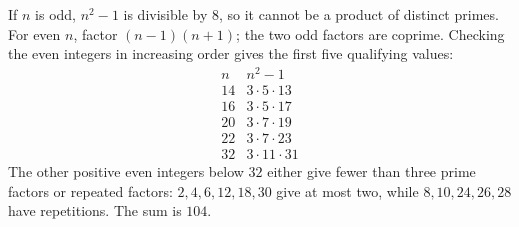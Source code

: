 If $n$ is odd, $n^2-1$ is divisible by $8$, so it cannot be a product of distinct primes. For even $n$, factor $(n-1)(n+1)$; the two odd factors are coprime. Checking the even integers in increasing order gives the first five qualifying values:
\[
\begin{array}{c|l}
n&n^2-1\\\hline
14&3\cdot5\cdot13\\
16&3\cdot5\cdot17\\
20&3\cdot7\cdot19\\
22&3\cdot7\cdot23\\
32&3\cdot11\cdot31
\end{array}
\]
The other positive even integers below $32$ either give fewer than three prime factors or repeated factors: $2,4,6,12,18,30$ give at most two, while $8,10,24,26,28$ have repetitions. The sum is $\boxed{104}$.
